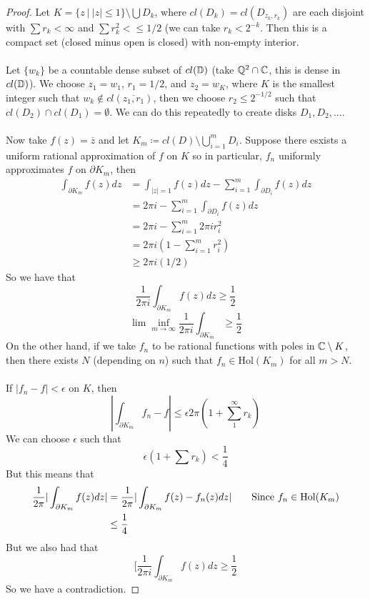 \begin{proof}
    Let $K = \{z\ |\ |z| \leq 1\} \setminus \bigcup D_k$, where $cl(D_k) = cl(D_{z_k, r_k})$ are each disjoint with $\sum r_k < \infty$ and $\sum r_k^2 <\leq 1/2$ (we can take $r_k < 2^{-k}$. Then this is a compact set (closed minus open is closed) with non-empty interior.\\\\
    Let $\{w_k\}$ be a countable dense subset of $cl(\mathbb{D})$ (take $\mathbb{Q}^2 \cap \mathbb{C}$, this is dense in $cl(\mathbb{D})$). We choose $z_1 = w_1$, $r_1 = 1/2$, and $z_2 = w_K$, where $K$ is the smallest integer such that $w_k \notin cl(\overline{z_1, r_1})$, then we choose $r_2 \leq 2^{-1/2}$ such that $cl(D_2) \cap cl(D_1) = \emptyset$. We can do this repeatedly to create disks $D_1, D_2, ...$.\\\\
    Now take $f(z) = \overline{z}$ and let $K_m \coloneqq cl(D) \setminus \bigcup_{i = 1}^m D_i$. Suppose there esxists a uniform rational approximation of $f$ on $K$ so in particular, $f_n$ uniformly approximates $f$ on $\partial K_m$, then
    \begin{align*}
        \int_{\partial K_m} f(z) dz &= \int_{|z| = 1} f(z) dz - \sum_{i = 1}^m \int_{\partial D_i} f(z) dz\\
        &= 2\pi i - \sum_{i = 1}^m \int_{\partial D_i} f(z) dz\\
        &= 2\pi i - \sum_{i = 1}^m 2\pi i r_i^2\\
        &= 2\pi i(1 - \sum_{i = 1}^m r_i^2)\\
        &\geq 2\pi i(1/2) \tag*{Since we construct $\sum r_i^2 \leq 1/2$}
    \end{align*}
    So we have that
    \[\frac{1}{2\pi i} \int_{\partial K_m} f(z) dz \geq \frac{1}{2}\]
    \[\lim \inf_{m \to \infty} \frac{1}{2\pi i} \int_{\partial K_m} \geq \frac{1}{2}\]
    On the other hand, if we take $f_n$ to be rational functions with poles in $\mathbb{C} \setminus K$, then there exists $N$ (depending on $n$) such that $f_n \in \text{Hol}(K_m)$ for all $m > N$.\\\\
    If $|f_n - f| < \epsilon$ on $K$, then
    \[|\int_{\partial K_m} f_n - f| \leq \epsilon 2\pi (1 + \sum_1^\infty r_k)\]
    We can choose $\epsilon$ such that
    \[\epsilon(1 + \sum r_k) < \frac{1}{4}\]
    But this means that
    \begin{align*}
        \frac{1}{2\pi} |\int_{\partial K_m} f(z) dz| &= \frac{1}{2\pi}|\int_{\partial K_m} f(z) - f_n(z) dz| \tag*{Since $f_n \in \text{Hol}(K_m)$}\\
        &\leq \frac{1}{4}
    \end{align*}
    But we also had that
    \[[\frac{1}{2\pi i} \int_{\partial K_m} f(z) dz \geq \frac{1}{2} \]
    So we have a contradiction.
\end{proof}
